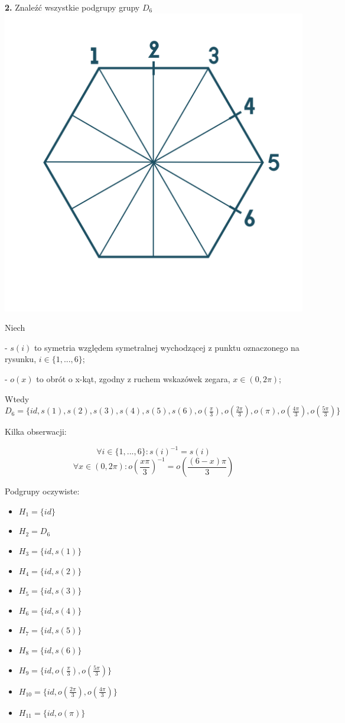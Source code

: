 \documentclass{article}
\begin{document}
\begin{center}
\Large{\textbf{2.} Znaleźć wszystkie podgrupy grupy $D_6$}
\includegraphics[scale=0.07]{sześciokąt foremny.jpg}
\end{center}
Niech 

- $s(i)$ to symetria względem symetralnej wychodzącej z punktu oznaczonego na rysunku, $i\in \{1,...,6\}$;

- $o(x)$ to obrót o x-kąt, zgodny z ruchem wskazówek zegara, $x\in (0,2\pi)$;

Wtedy $D_6=\{id, s(1), s(2), s(3), s(4), s(5), s(6), o(\frac{\pi}{3}), o(\frac{2\pi}{3}), o(\pi), o\left(\frac{4\pi}{3}\right), o\left(\frac{5\pi}{3}\right)\}$

Kilka obserwacji: 

$$\forall i\in \{1,...,6\}: s(i)^{-1}=s(i)$$
$$\forall x\in (0,2\pi): o\left(\frac{x\pi}{3}\right)^{-1}=o\left(\frac{(6-x)\pi}{3}\right)$$

Podgrupy oczywiste: 
\begin{itemize}
    \item $H_1=\{id\}$
    \item $H_2=D_6$
    \item $H_3=\{id, s(1)\}$
    \item $H_4=\{id, s(2)\}$
    \item $H_5=\{id, s(3)\}$
    \item $H_6=\{id, s(4)\}$
    \item $H_7=\{id, s(5)\}$
    \item $H_8=\{id, s(6)\}$
    \item $H_9=\{id, o(\frac{\pi}{3}), o(\frac{5\pi}{3})\}$
    \item $H_{10}=\{id, o(\frac{2\pi}{3}), o(\frac{4\pi}{3})\}$
    \item $H_{11}=\{id, o(\pi)\}$
\end{itemize}
\end{document}
